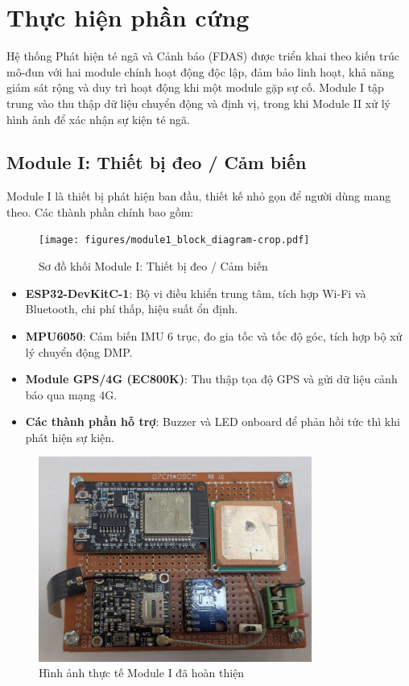 
\section{Thực hiện phần cứng}
\label{sec:hardware_implementation}

Hệ thống Phát hiện té ngã và Cảnh báo (FDAS) được triển khai theo kiến trúc mô-đun với hai module chính hoạt động độc lập, đảm bảo linh hoạt, khả năng giám sát rộng và duy trì hoạt động khi một module gặp sự cố. Module I tập trung vào thu thập dữ liệu chuyển động và định vị, trong khi Module II xử lý hình ảnh để xác nhận sự kiện té ngã.

\subsection{Module I: Thiết bị đeo / Cảm biến}
\label{ssec:module_one}

Module I là thiết bị phát hiện ban đầu, thiết kế nhỏ gọn để người dùng mang theo. Các thành phần chính bao gồm:

\begin{figure}[H]
    \centering
    \texttt{[image: figures/module1\_block\_diagram-crop.pdf]}
    \caption{Sơ đồ khối Module I: Thiết bị đeo / Cảm biến}
    \label{fig:module1_block_diagram}
\end{figure}

\begin{itemize}
    \item \textbf{ESP32-DevKitC-1}: Bộ vi điều khiển trung tâm, tích hợp Wi-Fi và Bluetooth, chi phí thấp, hiệu suất ổn định.
    \item \textbf{MPU6050}: Cảm biến IMU 6 trục, đo gia tốc và tốc độ góc, tích hợp bộ xử lý chuyển động DMP.
    \item \textbf{Module GPS/4G (EC800K)}: Thu thập tọa độ GPS và gửi dữ liệu cảnh báo qua mạng 4G.
    \item \textbf{Các thành phần hỗ trợ}: Buzzer và LED onboard để phản hồi tức thì khi phát hiện sự kiện.
\end{itemize}

\begin{figure}[H]
    \centering
    \includegraphics[width=0.8\textwidth]{figures/real_board1.jpg}
    \caption{Hình ảnh thực tế Module I đã hoàn thiện}
    \label{fig:module1_photo}
\end{figure}


